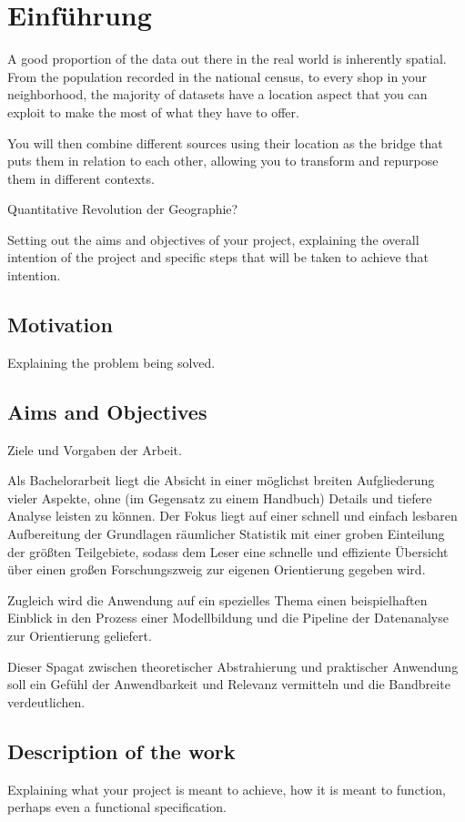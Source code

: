 \chapter{Einführung} %

A good proportion of the data out there in the real world is inherently spatial. 
From the population recorded in the national census, to every shop in your neighborhood, 
the majority of datasets have a location aspect that you can exploit to make the most of what they have to offer.

You will then combine different sources using their location as the bridge that puts them in relation to each other, allowing you to transform and repurpose them in different contexts.

Quantitative Revolution der Geographie?

Setting out the aims and objectives of your project, explaining the overall intention of the project and specific steps that will be taken to achieve that intention.

\section{Motivation}

Explaining the problem being solved.


\section{Aims and Objectives}

Ziele und Vorgaben der Arbeit.

Als Bachelorarbeit liegt die Absicht in einer möglichst breiten Aufgliederung vieler Aspekte, ohne (im Gegensatz zu einem Handbuch) Details und tiefere Analyse leisten zu können.  
Der Fokus liegt auf einer schnell und einfach lesbaren Aufbereitung der Grundlagen räumlicher Statistik mit einer groben Einteilung der größten Teilgebiete, 
sodass dem Leser eine schnelle und effiziente Übersicht über einen großen Forschungszweig zur eigenen Orientierung gegeben wird.

Zugleich wird die Anwendung auf ein spezielles Thema einen beispielhaften Einblick in den Prozess einer Modellbildung und die Pipeline der Datenanalyse 
zur Orientierung geliefert.

Dieser Spagat zwischen theoretischer Abstrahierung und praktischer Anwendung soll ein Gefühl der Anwendbarkeit und Relevanz vermitteln und die Bandbreite verdeutlichen.


\section{Description of the work}

Explaining what your project is meant to achieve, how it is meant to function, perhaps even a functional specification.



